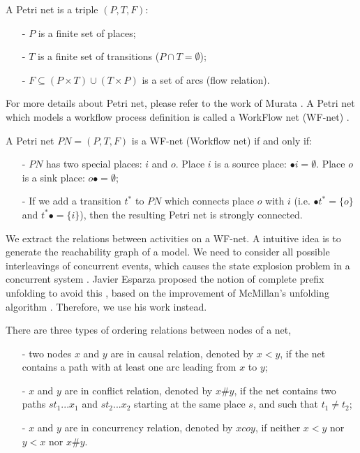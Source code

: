 \documentclass{llncs}
\begin{document}
\begin{definition}\label{def:petrinet}
A Petri net is a triple $(P,T,F)$:
	\begin{itemize}
		\item[-] $P$ is a finite set of places;
		\item[-] $T$ is a finite set of transitions ($P\cap T=\emptyset$);
		\item[-] $F\subseteq(P\times T)\cup(T\times P)$ is a set of arcs (flow relation).
	\end{itemize}
\end{definition}

For more details about Petri net, please refer to the work of Murata \cite{murata1989petri}. A Petri net which models a workflow process definition is called a WorkFlow net (WF-net) \cite{van1998application}.

\begin{definition}[WF-net]\label{def:wfnet}
A Petri net $PN=(P,T,F)$ is a WF-net (Workflow net) if and only if:
	\begin{itemize}
		\item[-] $PN$ has two special places: $i$ and $o$. Place $i$ is a source place: $\bullet i=\emptyset$. Place $o$ is a sink place: $o\bullet =\emptyset$;
		\item[-] If we add a transition $t^{*}$ to $PN$ which connects place $o$ with $i$ (i.e. $\bullet t^{*}=\{o\}$ and $t^{*}\bullet=\{i\}$), then the resulting Petri net is strongly connected.
	\end{itemize}
\end{definition}

We extract the relations between activities on a WF-net. A intuitive idea is to generate the reachability graph of a model. We need to consider all possible interleavings of concurrent events, which causes the state explosion problem in a concurrent system \cite{mcmillan1995technique}. Javier Esparza proposed the notion of complete prefix unfolding to avoid this \cite{esparza1996improvement}, based on the improvement of McMillan's unfolding algorithm \cite{mcmillan1995technique}. Therefore, we use his work instead.

\begin{definition}\label{def:orderingRelations}
There are three types of ordering relations between nodes of a net,
	\begin{itemize}
		\item[-] two nodes $x$ and $y$ are in causal relation, denoted by $x<y$, if the net contains a path with at least one arc leading from $x$ to $y$;
		\item[-] $x$ and $y$ are in conflict relation, denoted by $x\#y$, if the net contains two paths $st_{1}...x_{1}$ and $st_{2}...x_{2}$ starting at the same place $s$, and such that $t_{1}\neq t_{2}$;
		\item[-] $x$ and $y$ are in concurrency relation, denoted by $x co y$, if neither $x<y$ nor $y<x$ nor $x\#y$.
	\end{itemize}
\end{definition}
\end{document}
